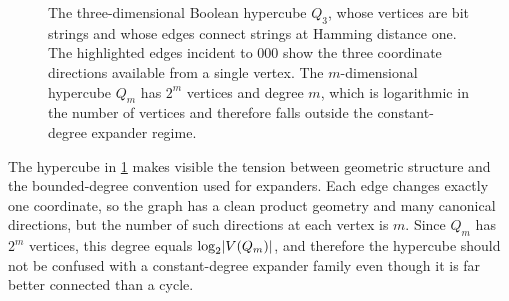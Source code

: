 \begin{figure}[t]
	\centering
	\begin{mdframed}[linewidth=0.4pt, linecolor=expanderMutedColor!45, backgroundcolor=white, roundcorner=2pt, innerleftmargin=6pt, innerrightmargin=6pt, innertopmargin=6pt, innerbottommargin=6pt]
		\centering
	\end{mdframed}
	\caption{The three-dimensional Boolean hypercube \(Q_3\), whose vertices are bit strings and whose edges connect strings at Hamming distance one. The highlighted edges incident to \(000\) show the three coordinate directions available from a single vertex. The \(m\)-dimensional hypercube \(Q_m\) has \(2^m\) vertices and degree \(m\), which is logarithmic in the number of vertices and therefore falls outside the constant-degree expander regime.}
	\label{fig:boolean-hypercube}
\end{figure}

The hypercube in \cref{fig:boolean-hypercube} makes visible the tension between geometric structure and the bounded-degree convention used for expanders. Each edge changes exactly one coordinate, so the graph has a clean product geometry and many canonical directions, but the number of such directions at each vertex is \(m\). Since \(Q_m\) has \(2^m\) vertices, this degree equals \(\operatorname*{log}_2\lvert V(Q_m)\rvert\), and therefore the hypercube should not be confused with a constant-degree expander family even though it is far better connected than a cycle.

